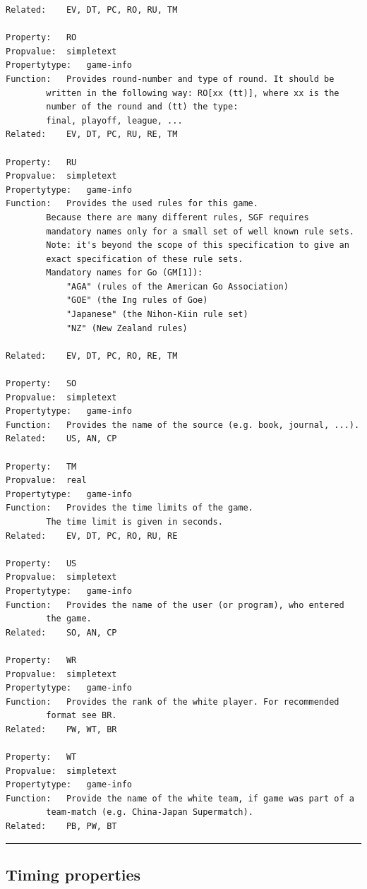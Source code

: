 \begin{verbatim}
Related:    EV, DT, PC, RO, RU, TM

Property:   RO
Propvalue:  simpletext
Propertytype:   game-info
Function:   Provides round-number and type of round. It should be
        written in the following way: RO[xx (tt)], where xx is the
        number of the round and (tt) the type:
        final, playoff, league, ...
Related:    EV, DT, PC, RU, RE, TM

Property:   RU
Propvalue:  simpletext
Propertytype:   game-info
Function:   Provides the used rules for this game.
        Because there are many different rules, SGF requires
        mandatory names only for a small set of well known rule sets.
        Note: it's beyond the scope of this specification to give an
        exact specification of these rule sets.
        Mandatory names for Go (GM[1]):
            "AGA" (rules of the American Go Association)
            "GOE" (the Ing rules of Goe)
            "Japanese" (the Nihon-Kiin rule set)
            "NZ" (New Zealand rules)

Related:    EV, DT, PC, RO, RE, TM

Property:   SO
Propvalue:  simpletext
Propertytype:   game-info
Function:   Provides the name of the source (e.g. book, journal, ...).
Related:    US, AN, CP

Property:   TM
Propvalue:  real
Propertytype:   game-info
Function:   Provides the time limits of the game.
        The time limit is given in seconds.
Related:    EV, DT, PC, RO, RU, RE

Property:   US
Propvalue:  simpletext
Propertytype:   game-info
Function:   Provides the name of the user (or program), who entered
        the game.
Related:    SO, AN, CP

Property:   WR
Propvalue:  simpletext
Propertytype:   game-info
Function:   Provides the rank of the white player. For recommended
        format see BR.
Related:    PW, WT, BR

Property:   WT
Propvalue:  simpletext
Propertytype:   game-info
Function:   Provide the name of the white team, if game was part of a
        team-match (e.g. China-Japan Supermatch).
Related:    PB, PW, BT
\end{verbatim}

\begin{center}\rule{0.5\linewidth}{0.5pt}\end{center}

\subsection{Timing properties}\label{timing-properties}

